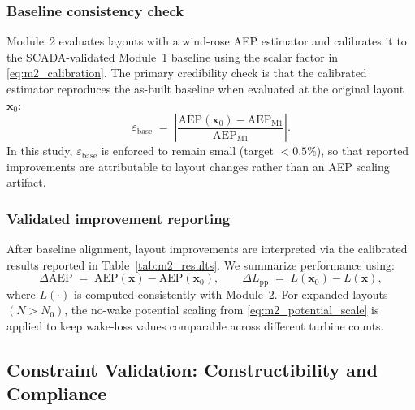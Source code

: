\documentclass[lettersize,journal]{IEEEtran}
\begin{document}
\subsubsection{Baseline consistency check}
Module~2 evaluates layouts with a wind-rose AEP estimator and calibrates it to the SCADA-validated Module~1 baseline using the scalar factor in \eqref{eq:m2_calibration}. The primary credibility check is that the calibrated estimator reproduces the as-built baseline when evaluated at the original layout $\mathbf{x}_0$:
\begin{equation}
\varepsilon_{\mathrm{base}} \;=\;
\left|
\frac{\mathrm{AEP}(\mathbf{x}_0)-\mathrm{AEP}_{\mathrm{M1}}}{\mathrm{AEP}_{\mathrm{M1}}}
\right|.
\label{eq:m3_baseline_residual}
\end{equation}
In this study, $\varepsilon_{\mathrm{base}}$ is enforced to remain small (target $<0.5\%$), so that reported improvements are attributable to layout changes rather than an AEP scaling artifact.

\subsubsection{Validated improvement reporting}
After baseline alignment, layout improvements are interpreted via the calibrated results reported in Table~\ref{tab:m2_results}. We summarize performance using:
\begin{equation}
\Delta \mathrm{AEP} \;=\; \mathrm{AEP}(\mathbf{x}) - \mathrm{AEP}(\mathbf{x}_0),
\qquad
\Delta L_{\mathrm{pp}} \;=\; L(\mathbf{x}_0)-L(\mathbf{x}),
\label{eq:m3_gains}
\end{equation}
where $L(\cdot)$ is computed consistently with Module~2. For expanded layouts $(N>N_0)$, the no-wake potential scaling from \eqref{eq:m2_potential_scale} is applied to keep wake-loss values comparable across different turbine counts.


\subsection{Constraint Validation: Constructibility and Compliance}
\label{subsec:constraint_validation}
\end{document}
